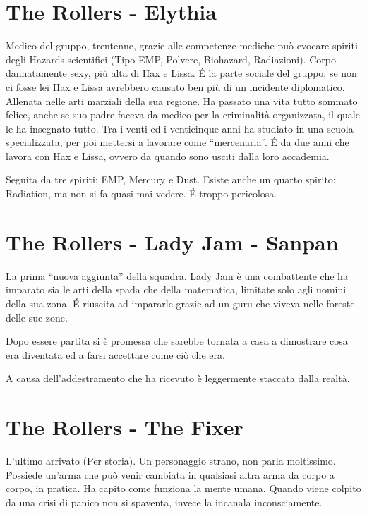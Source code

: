 \documentclass[9pt,a4paper,cleardoubleempty]{scrbook}
\begin{document}
    \section{The Rollers - Elythia}
        Medico del gruppo, trentenne, grazie alle competenze
        mediche può evocare spiriti degli Hazards scientifici (Tipo EMP,
        Polvere, Biohazard, Radiazioni). Corpo dannatamente sexy, più alta
        di Hax e Lissa. \'E la parte sociale del gruppo, se non ci fosse
        lei Hax e Lissa avrebbero causato ben più di un incidente
        diplomatico. Allenata nelle arti marziali della sua regione. Ha
        passato una vita tutto sommato felice, anche se suo padre faceva da
        medico per la criminalità organizzata, il quale le ha insegnato
        tutto. Tra i venti ed i venticinque anni ha studiato in una scuola
        specializzata, per poi mettersi a lavorare come ``mercenaria''. \'E
        da due anni che lavora con Hax e Lissa, ovvero da quando sono
        usciti dalla loro accademia.

        Seguita da tre spiriti: EMP, Mercury e Dust. Esiste anche un quarto
        spirito: Radiation, ma non si fa quasi mai vedere. \'E troppo
        pericolosa.

    \section{The Rollers - Lady Jam - Sanpan}
        La prima ``nuova aggiunta'' della squadra. Lady Jam è una
        combattente che ha imparato sia le arti della spada che della
        matematica, limitate solo agli uomini della sua zona. \'E riuscita
        ad impararle grazie ad un guru che viveva nelle foreste delle sue
        zone.

        Dopo essere partita si è promessa che sarebbe tornata a casa a
        dimostrare cosa era diventata ed a farsi accettare come ciò che
        era.

        A causa dell'addestramento che ha ricevuto è leggermente staccata
        dalla realtà.

    \section{The Rollers - The Fixer}
        L'ultimo arrivato (Per storia). Un personaggio strano, non parla
        moltissimo. \'Possiede un'arma che può venir cambiata in qualsiasi
        altra arma da corpo a corpo, in pratica. Ha capito come funziona la
        mente umana. Quando viene colpito da una crisi di panico non si
        spaventa, invece la incanala inconsciamente.
\end{document}
